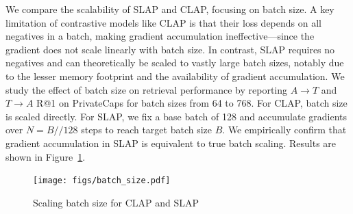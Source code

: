 \documentclass{article}
\begin{document}

We compare the scalability of SLAP and CLAP, focusing on batch size. A key limitation of contrastive models like CLAP is that their loss depends on all negatives in a batch, making gradient accumulation ineffective—since the gradient does not scale linearly with batch size. In contrast, SLAP requires no negatives and can theoretically be scaled to vastly large batch sizes, notably due to the lesser memory footprint and the availability of gradient accumulation. We study the effect of batch size on retrieval performance by reporting $A\rightarrow T$ and $T\rightarrow A$ R@1 on PrivateCaps for batch sizes from 64 to 768. For CLAP, batch size is scaled directly. For SLAP, we fix a base batch of 128 and accumulate gradients over $N = B // 128$ steps to reach target batch size $B$. We empirically confirm that gradient accumulation in SLAP is equivalent to true batch scaling. Results are shown in Figure~\ref{fig:Batch size scaling}.




\begin{figure}%
    \centering
    \texttt{[image: figs/batch\_size.pdf]}
    \caption{Scaling batch size for CLAP and SLAP}
    \label{fig:Batch size scaling}
\end{figure}
\end{document}
